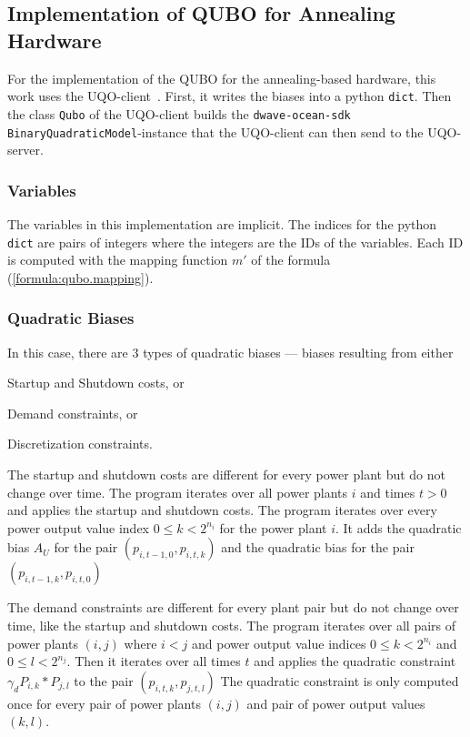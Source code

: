 \subsection{Implementation of QUBO for Annealing Hardware}
\label{implementation:annealing.qubo}

For the implementation of the QUBO for the annealing-based hardware, this work uses the UQO-client~\cite{UQOPyPI, UQOGitHub}.
First, it writes the biases into a python \texttt{dict}.
Then the class \texttt{Qubo} of the UQO-client builds the \texttt{dwave-ocean-sdk} \texttt{BinaryQuadraticModel}-instance that the UQO-client can then send to the UQO-server.

\subsubsection{Variables}
\label{implementation:annealing.qubo.variables}

The variables in this implementation are implicit.
The indices for the python \texttt{dict} are pairs of integers where the integers are the IDs of the variables.
Each ID is computed with the mapping function $m'$ of the formula (\ref{formula:qubo.mapping}).

\subsubsection{Quadratic Biases}
\label{implementation:annealing.qubo.quadratic}

In this case, there are $3$ types of quadratic biases --- biases resulting from either
\begin{enumerate*}[label=(\roman*)]
  \item Startup and Shutdown costs, or
  \item Demand constraints, or
  \item Discretization constraints.
\end{enumerate*}

The startup and shutdown costs are different for every power plant but do not change over time.
The program iterates over all power plants $i$ and times $t > 0$ and applies the startup and shutdown costs.
The program iterates over every power output value index $0 \leq k < 2^{n_i}$ for the power plant $i$.
It adds the quadratic bias $A_U$ for the pair $(p_{i, t-1, 0}, p_{i, t, k})$ and the quadratic bias for the pair $(p_{i, t-1, k}, p_{i, t, 0})$

The demand constraints are different for every plant pair but do not change over time, like the startup and shutdown costs.
The program iterates over all pairs of power plants $(i, j)$ where $i < j$ and power output value indices $0 \leq k < 2^{n_i}$ and $0 \leq l < 2^{n_j}$.
Then it iterates over all times $t$ and applies the quadratic constraint $\gamma_d P_{i, k} * P_{j, l}$ to the pair $(p_{i, t, k}, p_{j, t, l})$
The quadratic constraint is only computed once for every pair of power plants $(i, j)$ and pair of power output values $(k, l)$.

